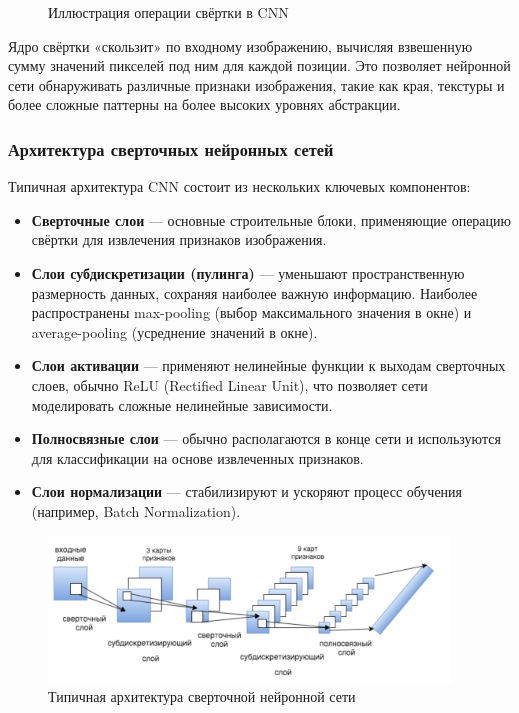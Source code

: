 \begin{figure}[h]
\centering
\caption{Иллюстрация операции свёртки в CNN}
\label{fig:convolution}
\end{figure}

Ядро свёртки «скользит» по входному изображению, вычисляя взвешенную сумму значений пикселей под ним для каждой позиции. Это позволяет нейронной сети обнаруживать различные признаки изображения, такие как края, текстуры и более сложные паттерны на более высоких уровнях абстракции.

\subsubsection{Архитектура сверточных нейронных сетей}
\label{review:cnn:architecture}

Типичная архитектура CNN состоит из нескольких ключевых компонентов:

\begin{itemize}
    \item \textbf{Сверточные слои} — основные строительные блоки, применяющие операцию свёртки для извлечения признаков изображения.
    \item \textbf{Слои субдискретизации (пулинга)} — уменьшают пространственную размерность данных, сохраняя наиболее важную информацию. Наиболее распространены max-pooling (выбор максимального значения в окне) и average-pooling (усреднение значений в окне).
    \item \textbf{Слои активации} — применяют нелинейные функции к выходам сверточных слоев, обычно ReLU (Rectified Linear Unit), что позволяет сети моделировать сложные нелинейные зависимости.
    \item \textbf{Полносвязные слои} — обычно располагаются в конце сети и используются для классификации на основе извлеченных признаков.
    \item \textbf{Слои нормализации} — стабилизируют и ускоряют процесс обучения (например, Batch Normalization).
\end{itemize}

\begin{figure}[h]
\centering
\includegraphics[width=0.95\textwidth]{figures/typical_cnn.png}
\caption{Типичная архитектура сверточной нейронной сети}
\label{fig:cnn_architecture}
\end{figure}

